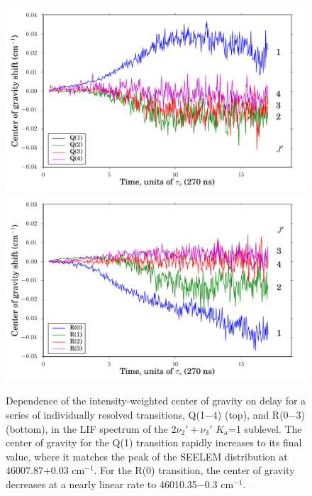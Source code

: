 \documentclass[12pt]{mitthesis}
\newcommand{\rcm}{cm$^{-1}$}
\begin{document}
\begin{figure}
  \caption{Dependence of the intensity-weighted center of gravity on
    delay for a series of individually resolved transitions, Q(1$-$4)
    (top), and R(0$-$3) (bottom), in the LIF spectrum of the
    $2\nu_2'+\nu_3'$ $K_a$=1 sublevel.  The center of gravity for the
    Q(1) transition rapidly increases to its final value, where it
    matches the peak of the SEELEM distribution at 46007.87$+$0.03
    \rcm.  For the R(0) transition, the center of gravity decreases at
    a nearly linear rate to 46010.35$-$0.3 \rcm.}
  \label{fig:2231-cog-delay}
  \centering
  \vspace{5mm}
  \includegraphics[width=6in]{2231-q1234-cog-delay.pdf}
  \includegraphics[width=6in]{2231-r0123-cog-delay.pdf}
\end{figure}

\end{document}
